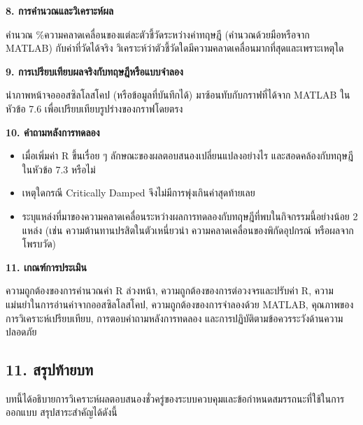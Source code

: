 \textbf{8. การคำนวณและวิเคราะห์ผล}

คำนวณ \%ความคลาดเคลื่อนของแต่ละตัวชี้วัดระหว่างค่าทฤษฎี (คำนวณด้วยมือหรือจาก MATLAB) กับค่าที่วัดได้จริง วิเคราะห์ว่าตัวชี้วัดใดมีความคลาดเคลื่อนมากที่สุดและเพราะเหตุใด

\textbf{9. การเปรียบเทียบผลจริงกับทฤษฎีหรือแบบจำลอง}

นำภาพหน้าจอออสซิลโลสโคป (หรือข้อมูลที่บันทึกได้) มาซ้อนทับกับกราฟที่ได้จาก MATLAB ในหัวข้อ 7.6 เพื่อเปรียบเทียบรูปร่างของกราฟโดยตรง

\textbf{10. คำถามหลังการทดลอง}

\begin{itemize}
    \item เมื่อเพิ่มค่า R ขึ้นเรื่อย ๆ ลักษณะของผลตอบสนองเปลี่ยนแปลงอย่างไร และสอดคล้องกับทฤษฎีในหัวข้อ 7.3 หรือไม่
    \item เหตุใดกรณี Critically Damped จึงไม่มีการพุ่งเกินค่าสุดท้ายเลย
    \item ระบุแหล่งที่มาของความคลาดเคลื่อนระหว่างผลการทดลองกับทฤษฎีที่พบในกิจกรรมนี้อย่างน้อย 2 แหล่ง (เช่น ความต้านทานปรสิตในตัวเหนี่ยวนำ ความคลาดเคลื่อนของพิกัดอุปกรณ์ หรือผลจากโพรบวัด)
\end{itemize}

\textbf{11. เกณฑ์การประเมิน}

ความถูกต้องของการคำนวณค่า R ล่วงหน้า, ความถูกต้องของการต่อวงจรและปรับค่า R, ความแม่นยำในการอ่านค่าจากออสซิลโลสโคป, ความถูกต้องของการจำลองด้วย MATLAB, คุณภาพของการวิเคราะห์เปรียบเทียบ, การตอบคำถามหลังการทดลอง และการปฏิบัติตามข้อควรระวังด้านความปลอดภัย

\newpage

\subsection{11. สรุปท้ายบท}

บทนี้ได้อธิบายการวิเคราะห์ผลตอบสนองชั่วครู่ของระบบควบคุมและข้อกำหนดสมรรถนะที่ใช้ในการออกแบบ สรุปสาระสำคัญได้ดังนี้

